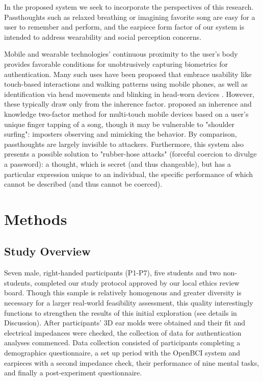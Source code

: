 \documentclass{sigchi}
\begin{document}
In the proposed system we seek to incorporate the perspectives of this research. Passthoughts such as relaxed breathing or imagining favorite song are easy for a user to remember and perform, and the earpiece form factor of our system is intended to address wearability and social perception concerns.

Mobile and wearable technologies' continuous proximity to the user's body provides favorable conditions for unobtrusively capturing biometrics for authentication. Many such uses have been proposed that embrace usability like touch-based interactions \cite{Tartz2015, Holz2015} and walking patterns \cite{Lu2014} using mobile phones, as well as identification via head movements and blinking in head-worn devices \cite{Rogers2015}. However, these typically draw only from the inherence factor. \cite{Chen2015} proposed an inherence and knowledge two-factor method for multi-touch mobile devices based on a user's unique finger tapping of a song, though it may be vulnerable to "shoulder surfing": imposters observing and mimicking the behavior. By comparison, passthoughts are largely invisible to attackers. Furthermore, this system also presents a possible solution to "rubber-hose attacks" (forceful coercion to divulge a password): a thought, which is secret (and thus changeable), but has a particular expression unique to an individual, the specific performance of which cannot be described (and thus cannot be coerced).

\section{Methods}

\subsection{Study Overview}

Seven male, right-handed participants (P1-P7), five students and two non-students, completed our study protocol approved by our local ethics review board. Though this sample is relatively homogenous and greater diversity is necessary for a larger real-world feasibility assessment, this quality interestingly functions to strengthen the results of this initial exploration (see details in Discussion). After participants' 3D ear molds were obtained and their fit and electrical impedances were checked, the collection of data for authentication analyses commenced. Data collection consisted of participants completing a demographics questionnaire, a set up period with the OpenBCI system and earpieces with a second impedance check, their performance of nine mental tasks, and finally a post-experiment questionnaire.
\end{document}
